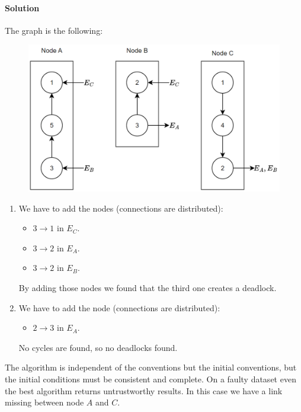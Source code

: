 \paragraph*{Solution}
The graph is the following: 
\begin{figure}[H]
    \centering
    \includegraphics[width=0.6\linewidth]{images/Ob4.png}
\end{figure}
\begin{enumerate}
    \item We have to add the nodes (connections are distributed): 
        \begin{itemize}
            \item $3 \rightarrow 1$ in $E_C$. 
            \item $3 \rightarrow 2$ in $E_A$. 
            \item $3 \rightarrow 2$ in $E_B$. 
        \end{itemize}
        By adding those nodes we found that the third one creates a deadlock. 
    \item We have to add the node (connections are distributed): 
        \begin{itemize}
            \item $2 \rightarrow 3$ in $E_A$. 
        \end{itemize}
        No cycles are found, so no deadlocks found. 
\end{enumerate}
The algorithm is independent of the conventions but the initial conventions, but the initial conditions must be consistent and complete. 
On a faulty dataset even the best algorithm returns untrustworthy results. In this case we have a link missing between node $A$ and $C$.